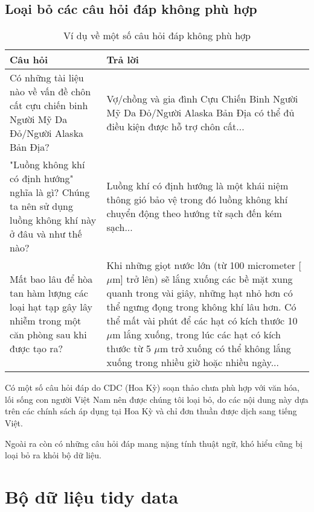 \documentclass[runningheads]{llncs}
\begin{document}
\subsection{Loại bỏ các câu hỏi đáp không phù hợp}
\vspace{-0.4cm}
\begin{table}
	\setlength{\tabcolsep}{0.5em}
	\renewcommand{\arraystretch}{1.4}
	\begin{center}
	\caption{Ví dụ về một số câu hỏi đáp không phù hợp}\label{tab3}
		\begin{tabular}{ | p{5.75cm} | p{5.75cm} |} 
			\hline
    		\textbf{Câu hỏi} & \textbf{Trả lời}\\ 
			\hline
			Có những tài liệu nào về vấn đề chôn cất cựu chiến binh Người Mỹ Da Đỏ/Người Alaska Bản Địa? & Vợ/chồng và gia đình Cựu Chiến Binh Người Mỹ Da Đỏ/Người Alaska Bản Địa có thể đủ điều kiện được hỗ trợ chôn cất...\\ 
			\hline
				"Luồng không khí có định hướng" nghĩa là gì? Chúng ta nên sử dụng luồng không khí này ở đâu và như thế nào?& Luồng khí có định hướng là một khái niệm thông gió bảo vệ trong đó luồng không khí chuyển động theo hướng từ sạch đến kém sạch...\\
			\hline
				Mất bao lâu để hòa tan hàm lượng các loại hạt tạp gây lây nhiễm trong một căn phòng sau khi được tạo ra?& Khi những giọt nước lớn (từ 100 micrometer [$\mu$m] trở lên) sẽ lắng xuống các bề mặt xung quanh trong vài giây, những hạt nhỏ hơn có thể ngưng đọng trong không khí lâu hơn. Có thể mất vài phút để các hạt có kích thước 10 $\mu$m lắng xuống, trong lúc các hạt có kích thước từ 5 $\mu$m trở xuống có thể không lắng xuống trong nhiều giờ hoặc nhiều ngày...\\
			\hline
			\end{tabular}
		\end{center}
\end{table}
\vspace{-0.8cm}
Có một số câu hỏi đáp do CDC (Hoa Kỳ) soạn thảo chưa phù hợp với văn hóa, lối sống con người Việt Nam nên được chúng tôi loại bỏ, do các nội dung này dựa trên các chính sách áp dụng tại Hoa Kỳ và chỉ đơn thuần được dịch sang tiếng Việt. 

Ngoài ra còn có những câu hỏi đáp mang nặng tính thuật ngữ, khó hiểu cũng bị loại bỏ ra khỏi bộ dữ liệu.

\section{Bộ dữ liệu tidy data}
\end{document}
